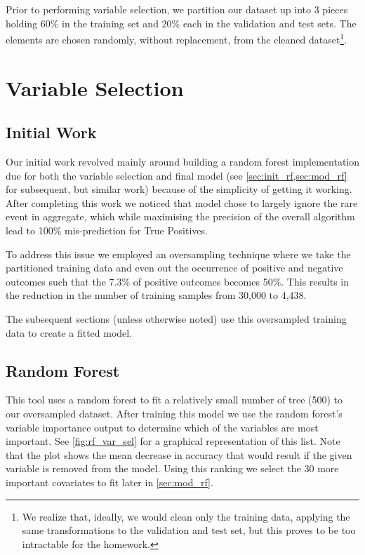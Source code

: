 \documentclass[11pt, fleqn]{article}
\begin{document}
Prior to performing variable selection, we partition our dataset up into 3 pieces holding 60\% in the training set and 20\% each in the validation and test sets.  The elements are chosen randomly, without replacement, from the cleaned dataset\footnote{We realize that, ideally, we would clean only the training data, applying the same transformations to the validation and test set, but this proves to be too intractable for the homework.}.

\section{Variable Selection}
\subsection{Initial Work}
Our initial work revolved mainly around building a random forest implementation due for both the variable selection and final model (see \cref{sec:init_rf,sec:mod_rf} for subsequent, but similar work) because of the simplicity of getting it working.  After completing this work we noticed that model chose to largely ignore the rare event in aggregate, which while maximising the precision of the overall algorithm lead to 100\% mis-prediction for True Positives.  

To address this issue we employed an oversampling technique where we take the partitioned training data and even out the occurrence of positive and negative outcomes such that the 7.3\% of positive outcomes becomes 50\%.  This results in the reduction in the number of training samples from 30,000 to 4,438.

The subsequent sections (unless otherwise noted) use this oversampled training data to create a fitted model.

\subsection{Random Forest}\label{sec:init_rf}
This tool uses a random forest to fit a relatively small number of tree (500) to our oversampled dataset.  After training this model we use the random forest's variable importance output to determine which of the variables are most important.  See \cref{fig:rf_var_sel} for a graphical representation of this list.  Note that the plot shows the mean decrease in accuracy that would result if the given variable is removed from the model.  Using this ranking we select the 30 more important covariates to fit later in \cref{sec:mod_rf}.
\end{document}
